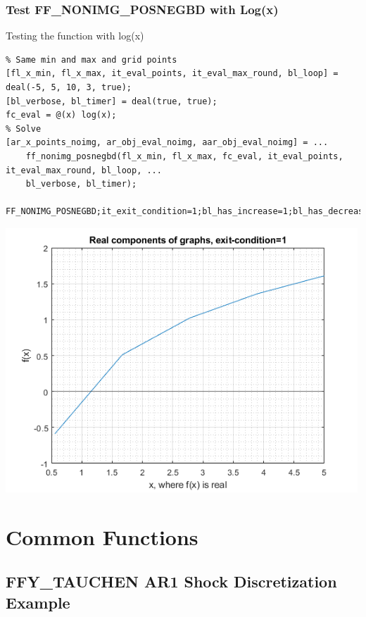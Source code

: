 \documentclass[
]{book}
\begin{document}
\hypertarget{test-ff_nonimg_posnegbd-with-logx}{%
\subsection{Test FF\_NONIMG\_POSNEGBD with Log(x)}\label{test-ff_nonimg_posnegbd-with-logx}}

Testing the function with log(x)

\begin{verbatim}
% Same min and max and grid points
[fl_x_min, fl_x_max, it_eval_points, it_eval_max_round, bl_loop] = deal(-5, 5, 10, 3, true);
[bl_verbose, bl_timer] = deal(true, true);
fc_eval = @(x) log(x);
% Solve
[ar_x_points_noimg, ar_obj_eval_noimg, aar_obj_eval_noimg] = ...
    ff_nonimg_posnegbd(fl_x_min, fl_x_max, fc_eval, it_eval_points, it_eval_max_round, bl_loop, ...
    bl_verbose, bl_timer);

FF_NONIMG_POSNEGBD;it_exit_condition=1;bl_has_increase=1;bl_has_decrease=0;bl_has_constant=0;bl_has_pos=1;bl_has_neg=1;bl_has_zero=0
\end{verbatim}

\includegraphics[width=5.20833in,height=\textheight]{img/fx_nonimg_posnegbd_images/figure_1.png}

\hypertarget{common-functions}{%
\chapter{Common Functions}\label{common-functions}}

\hypertarget{ffy_tauchen-ar1-shock-discretization-example}{%
\section{FFY\_TAUCHEN AR1 Shock Discretization Example}\label{ffy_tauchen-ar1-shock-discretization-example}}
\end{document}
